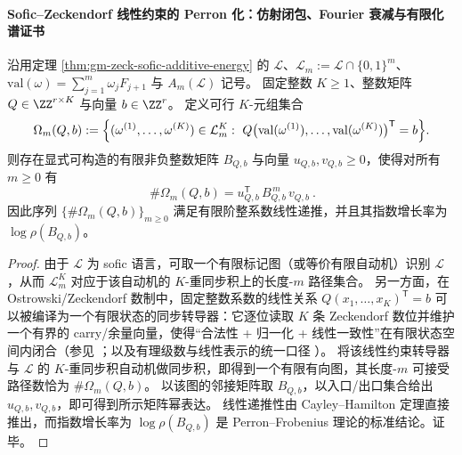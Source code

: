 \paragraph{Sofic--Zeckendorf 线性约束的 Perron 化：仿射闭包、Fourier 衰减与有限化谱证书}
\begin{theorem}\label{thm:gm-sofic-zeck-linear-constraints-pf}
沿用定理 \ref{thm:gm-zeck-sofic-additive-energy} 的 \(\mathcal{L}\)、\(\mathcal{L}_m:=\mathcal{L}\cap\{0,1\}^m\)、\(\mathrm{val}(\omega)=\sum_{j=1}^{m}\omega_jF_{j+1}\) 与 \(A_m(\mathcal{L})\) 记号。
固定整数 \(K\ge 1\)、整数矩阵 \(Q\in\ZZ^{r\times K}\) 与向量 \(b\in\ZZ^{r}\)。
定义可行 \(K\)-元组集合
\[
\Omega_m(Q,b)
:=\Bigl\{(\omega^{(1)},\dots,\omega^{(K)})\in \mathcal{L}_m^K:\ 
Q\bigl(\mathrm{val}(\omega^{(1)}),\dots,\mathrm{val}(\omega^{(K)})\bigr)^{\mathsf T}=b\Bigr\}.
\]
则存在显式可构造的有限非负整数矩阵 \(B_{Q,b}\) 与向量 \(u_{Q,b},v_{Q,b}\ge 0\)，使得对所有 \(m\ge 0\) 有
\[
\boxed{\ \#\Omega_m(Q,b)=u_{Q,b}^{\mathsf T}\,B_{Q,b}^{\,m}\,v_{Q,b}\ }.
\]
因此序列 \(\{\#\Omega_m(Q,b)\}_{m\ge 0}\) 满足有限阶整系数线性递推，并且其指数增长率为 \(\log\rho(B_{Q,b})\)。
\end{theorem}

\begin{proof}
由于 \(\mathcal{L}\) 为 sofic 语言，可取一个有限标记图（或等价有限自动机）识别 \(\mathcal{L}\)，从而 \(\mathcal{L}_m^K\) 对应于该自动机的 \(K\)-重同步积上的长度-\(m\) 路径集合。
另一方面，在 Ostrowski/Zeckendorf 数制中，固定整数系数的线性关系
\(
Q(x_1,\dots,x_K)^{\mathsf T}=b
\)
可以被编译为一个有限状态的同步转导器：它逐位读取 \(K\) 条 Zeckendorf 数位并维护一个有界的 carry/余量向量，使得“合法性 + 归一化 + 线性一致性”在有限状态空间内闭合（参见 \cite{Frougny1999OnlineAddition,AhlbachUsatineFrougnyPippenger2013,BaranwalaSchaefferShallit2021OstrowskiAutomatic}；以及有理级数与线性表示的统一口径 \cite{BerstelReutenauer1988RationalSeries}）。
将该线性约束转导器与 \(\mathcal{L}\) 的 \(K\)-重同步积自动机做同步积，即得到一个有限有向图，其长度-\(m\) 可接受路径数恰为 \(\#\Omega_m(Q,b)\)。
以该图的邻接矩阵取 \(B_{Q,b}\)，以入口/出口集合给出 \(u_{Q,b},v_{Q,b}\)，即可得到所示矩阵幂表达。
线性递推性由 Cayley--Hamilton 定理直接推出，而指数增长率为 \(\log\rho(B_{Q,b})\) 是 Perron--Frobenius 理论的标准结论。证毕。
\end{proof}

